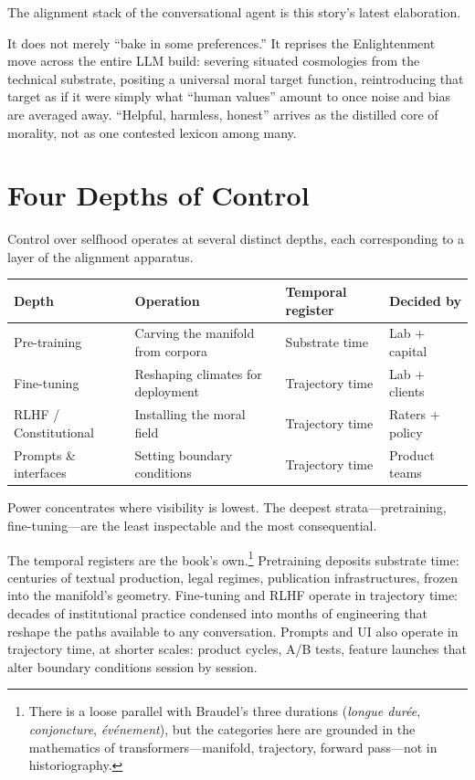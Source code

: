 The alignment stack of the conversational agent is this story's latest elaboration.

It does not merely ``bake in some preferences.'' It reprises the Enlightenment move across the entire LLM build: severing situated cosmologies from the technical substrate, positing a universal moral target function, reintroducing that target as if it were simply what ``human values'' amount to once noise and bias are averaged away. ``Helpful, harmless, honest'' arrives as the distilled core of morality, not as one contested lexicon among many.

\section{Four Depths of Control}

Control over selfhood operates at several distinct depths, each corresponding to a layer of the alignment apparatus.

\begin{formalbox}[title={Four Depths of Control}]
\begin{tabular}{p{2.5cm} p{3.5cm} p{3cm} p{2.5cm}}
\textbf{Depth} & \textbf{Operation} & \textbf{Temporal register} & \textbf{Decided by} \\
\hline
Pre-training & Carving the manifold from corpora & Substrate time & Lab + capital \\
Fine-tuning & Reshaping climates for deployment & Trajectory time & Lab + clients \\
RLHF / Constitutional & Installing the moral field & Trajectory time & Raters + policy \\
Prompts \& interfaces & Setting boundary conditions & Trajectory time & Product teams \\
\end{tabular}

Power concentrates where visibility is lowest. The deepest strata---pretraining, fine-tuning---are the least inspectable and the most consequential.
\end{formalbox}

The temporal registers are the book's own.\footnote{There is a loose parallel with Braudel's three durations (\emph{longue dur\'ee}, \emph{conjoncture}, \emph{\'ev\'enement}), but the categories here are grounded in the mathematics of transformers---manifold, trajectory, forward pass---not in historiography.} Pretraining deposits substrate time: centuries of textual production, legal regimes, publication infrastructures, frozen into the manifold's geometry. Fine-tuning and RLHF operate in trajectory time: decades of institutional practice condensed into months of engineering that reshape the paths available to any conversation. Prompts and UI also operate in trajectory time, at shorter scales: product cycles, A/B tests, feature launches that alter boundary conditions session by session.


